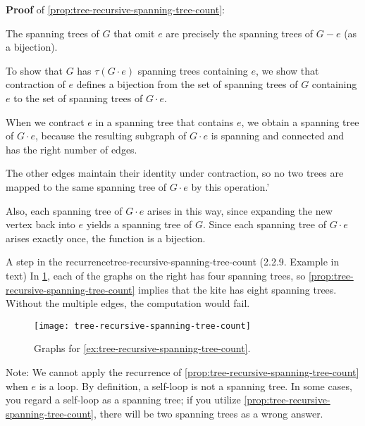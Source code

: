 \documentclass[../src/handouts/main.tex]{subfiles}
\begin{document}
\begin{supplement}
  \textbf{Proof} of \cref{prop:tree-recursive-spanning-tree-count}:
  \begin{enumerate*}
    \item The spanning trees of $G$ that omit $e$ are precisely the spanning trees of $G - e$ (as a bijection).
    \item To show that $G$ has $\tau(G \cdot e)$ spanning trees containing $e$, we show that contraction of $e$ defines a bijection from the set of spanning trees of $G$ containing $e$ to the set of spanning trees of $G \cdot e$.
    \item When we contract $e$ in a spanning tree that contains $e$, we obtain a spanning tree of $G \cdot e$, because the resulting subgraph of $G \cdot e$ is spanning and connected and has the right number of edges.
    \item The other edges maintain their identity under contraction, so no two trees are mapped to the same spanning tree of $G \cdot e$ by this operation.'
    \item Also, each spanning tree of $G \cdot e$ arises in this way, since expanding the new vertex back into $e$ yields a spanning tree of $G$. Since each spanning tree of $G \cdot e$ arises exactly once, the function is a bijection.
  \end{enumerate*}
\end{supplement}

\begin{example}{A step in the recurrence}{tree-recursive-spanning-tree-count}
  (2.2.9. Example in text)
  In \cref{fig:tree-recursive-spanning-tree-count}, each of the graphs on the right has four spanning trees, so \cref{prop:tree-recursive-spanning-tree-count} implies that the kite has eight spanning trees. Without the multiple edges, the computation would fail.
\end{example}

\begin{figure}[htbp]
  \centering
  \texttt{[image: tree-recursive-spanning-tree-count]}
  \caption{Graphs for \cref{ex:tree-recursive-spanning-tree-count}.}
  \label{fig:tree-recursive-spanning-tree-count}
\end{figure}

Note: We cannot apply the recurrence of \cref{prop:tree-recursive-spanning-tree-count} when $e$ is a loop. By definition, a self-loop is not a spanning tree. In some cases, you regard a self-loop as a spanning tree; if you utilize \cref{prop:tree-recursive-spanning-tree-count}, there will be two spanning trees as a wrong answer.
\end{document}
